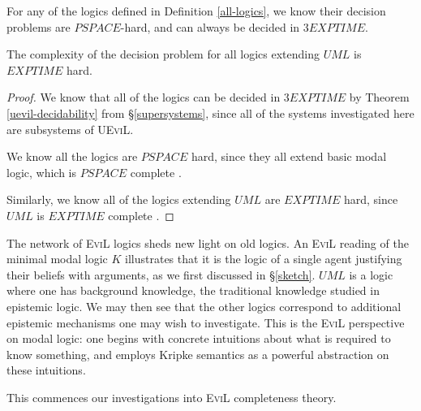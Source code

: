 \begin{lemma}
For any of the logics defined in Definition
\ref{all-logics}, we know their decision problems are $PSPACE$-hard, and can always be
decided in  $3EXPTIME$.

The complexity of the decision problem for all logics extending $UML$
is $EXPTIME$ hard.
\end{lemma}
\begin{proof}
We know that all of the logics can be decided in $3EXPTIME$ by Theorem
\ref{uevil-decidability} from \S\ref{supersystems}, since all of the
systems investigated here are subsystems of U\textsc{EviL}. 

We know all the logics are $PSPACE$ hard, since they all extend basic
modal logic, which is $PSPACE$ complete \cite[chapter
6.3]{van_benthem_modal_2010}.

Similarly, we know all of the logics extending $UML$ are $EXPTIME$
hard, since $UML$ is $EXPTIME$ complete \cite[chapter
7.4]{van_benthem_modal_2010}.
\end{proof}

The network of \textsc{EviL} logics sheds new light on old logics.  An
\textsc{EviL} reading of the minimal modal logic $K$ illustrates that
it is the logic of a single agent justifying their beliefs with
arguments, as we first discussed in \S\ref{sketch}.  $UML$ is a logic where one has background knowledge, the
traditional knowledge studied in epistemic logic.  We may then see
that the other logics correspond to additional epistemic mechanisms 
one may wish to investigate.  This is the \textsc{EviL} perspective on
modal logic:  one begins with concrete intuitions about what is
required to know something, and employs Kripke semantics as a powerful
abstraction on these intuitions.  

This commences our investigations into \textsc{EviL} completeness
theory.

